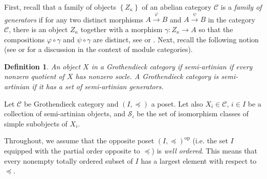 \documentclass[11pt]{article}
\theoremstyle{plain}
\theoremstyle{nonumberplain}
\theoremstyle{plain}
\newtheorem{definition}[lemma]{Definition}
\theoremstyle{nonumberplain}
\newcommand\cC{\mathcal C}
\newcommand\cS{\mathcal S}
\DeclareMathOperator{\op}{\mathrm{op}}
\begin{document}
First, recall that a family of objects $\left\{Z_\kappa\right\}$ of an
abelian category $\mathcal{C}$ is a \emph{family of generators} if for
any two distinct morphisms $A\overset{\varphi}{\longrightarrow}B$ and
$A\overset{\psi}{\longrightarrow}B$ in the category $\mathcal{C}$,
there is an object $Z_\kappa$ together with a morphism
$\gamma:Z_\kappa\to A$ so that the compositions $\varphi\circ\gamma$
and $\psi\circ\gamma$ are distinct, see \cite[$\S$V.7]{cats} or
\cite[discussion preceding Proposition 1.2.2]{groth}. Next, recall the
following notion (see \cite[$\S$5.6]{groth} or \cite[$\S$41]{BW} for a
discussion in the context of module categories).



\begin{definition}\label{def.sa}
  An object $X$ in a Grothendieck category if {\it semi-artinian} if
  every nonzero quotient of $X$ has nonzero socle.  A Grothendieck
  category is {\it semi-artinian} if it has a set of semi-artinian
  generators.
\end{definition}







Let $\cC$ be Grothendieck category and $(I,{{\preceq}})$ a poset. Let
also $X_i\in \cC$, $i\in I$ be a collection of semi-artinian objects,
and $\cS_i$ be the set of isomorphism classes of simple subobjects of
$X_i$.









Throughout, we assume that the opposite poset $(I,{{\preceq}})^{\op}$
(i.e. {{the set}} $I$ equipped with the partial order opposite to
${{\preceq}}$) is {\it well ordered}.  This means that every nonempty
totally ordered subset of $I$ has a largest element with respect to
${{\preceq}}$.
\end{document}
